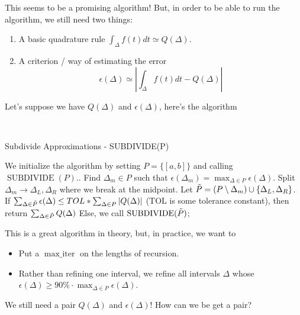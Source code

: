 \documentclass{article}
\begin{document}
This seems to be a promising algorithm! But, in order to be able to run the algorithm, we still need two things:
\begin{enumerate}
    \item A basic quadrature rule $\int_\Delta f(t) dt \simeq Q(\Delta)$.
    \item A criterion / way of estimating the error
    \[\epsilon(\Delta) \simeq |\int_\Delta f(t) dt - Q(\Delta) |\]
\end{enumerate}

Let's suppose we have $Q(\Delta)$ and $\epsilon(\Delta)$, here's the algorithm

\begin{tcolorbox}[standard jigsaw,opacityback=0]\\
\begin{algorithm}[H]
\caption{Subdivide Approximations - SUBDIVIDE(P)}
We initialize the algorithm by setting $P = \{[a, b]\}$ and calling $\operatorname{SUBDIVIDE}(P)$.. Find $\Delta_m \in P$ such that $\epsilon(\Delta_m) = \max_{\Delta \in P} \epsilon(\Delta)$. Split $\Delta_m \to \Delta_L, \Delta_R$ where we break at the midpoint. Let $\Tilde{P} = (P \setminus \Delta_m) \cup \{\Delta_L, \Delta_R\}$. If $\sum_{\Delta \in \Tilde{P}} \epsilon(\Delta) \leq TOL * \sum_{\Delta \in P} |Q(\Delta)|$ (TOL is some tolerance constant), then return $\sum_{\Delta \in \Tilde{P}} Q(\Delta)$\; Else, we call $\operatorname{SUBDIVIDE}(\Tilde{P})$;
\end{algorithm}
\end{tcolorbox}

This is a great algorithm in theory, but, in practice, we want to
\begin{itemize}
    \item Put a $\operatorname{max\_iter}$ on the lengths of recursion.
    \item Rather than refining one interval, we refine all intervals $\Delta$ whose $\epsilon(\Delta) \geq 90\% \cdot \max_{\Delta \in P} \epsilon(\Delta)$. 
\end{itemize}

\begin{question}
    We still need a pair $Q(\Delta)$ and $\epsilon(\Delta)$! How can we be get a pair?
\end{question}
\end{document}
